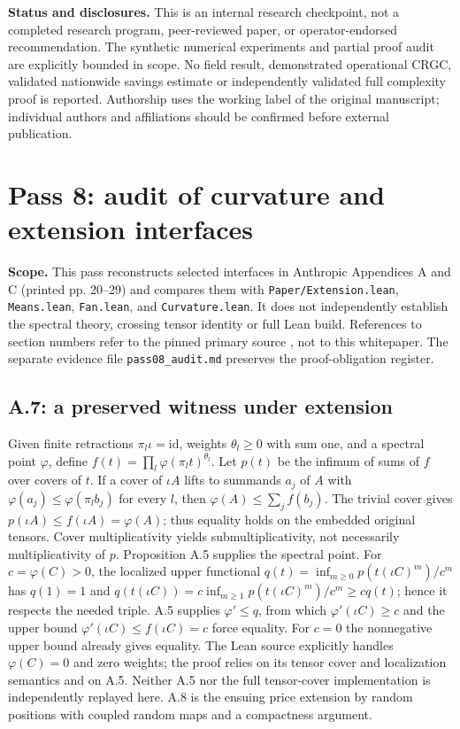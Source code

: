 \documentclass[11pt,letterpaper]{article}
\begin{document}
\textbf{Status and disclosures.} This is an internal research checkpoint, not a completed research program, peer-reviewed paper, or operator-endorsed recommendation. The synthetic numerical experiments and partial proof audit are explicitly bounded in scope. No field result, demonstrated operational CRGC, validated nationwide savings estimate or independently validated full complexity proof is reported. Authorship uses the working label of the original manuscript; individual authors and affiliations should be confirmed before external publication.

\appendix
\section{Pass 8: audit of curvature and extension interfaces}
\label{sec:pass08}
\textbf{Scope.} This pass reconstructs selected interfaces in Anthropic Appendices A and C (printed pp. 20--29) and compares them with \texttt{Paper/Extension.lean}, \texttt{Means.lean}, \texttt{Fan.lean}, and \texttt{Curvature.lean}. It does not independently establish the spectral theory, crossing tensor identity or full Lean build. References to section numbers refer to the pinned primary source \cite{anthropic}, not to this whitepaper. The separate evidence file \texttt{pass08\_audit.md} preserves the proof-obligation register.

\subsection{A.7: a preserved witness under extension}
Given finite retractions $\pi_l\iota=\mathrm{id}$, weights $\theta_l\ge0$ with sum one, and a spectral point $\varphi$, define $f(t)=\prod_l\varphi(\pi_l t)^{\theta_l}$. Let $p(t)$ be the infimum of sums of $f$ over covers of $t$. If a cover of $\iota A$ lifts to summands $a_j$ of $A$ with $\varphi(a_j)\le\varphi(\pi_l b_j)$ for every $l$, then $\varphi(A)\le\sum_jf(b_j)$. The trivial cover gives $p(\iota A)\le f(\iota A)=\varphi(A)$; thus equality holds on the embedded original tensors. Cover multiplicativity yields submultiplicativity, not necessarily multiplicativity of $p$. Proposition A.5 supplies the spectral point. For $c=\varphi(C)>0$, the localized upper functional $q(t)=\inf_{m\ge0}p(t(\iota C)^m)/c^m$ has $q(1)=1$ and $q(t(\iota C))=c\inf_{m\ge1}p(t(\iota C)^m)/c^m\ge c q(t)$; hence it respects the needed triple. A.5 supplies $\varphi'\le q$, from which $\varphi'(\iota C)\ge c$ and the upper bound $\varphi'(\iota C)\le f(\iota C)=c$ force equality. For $c=0$ the nonnegative upper bound already gives equality. The Lean source explicitly handles $\varphi(C)=0$ and zero weights; the proof relies on its tensor cover and localization semantics and on A.5. Neither A.5 nor the full tensor-cover implementation is independently replayed here. A.8 is the ensuing price extension by random positions with coupled random maps and a compactness argument.
\end{document}

